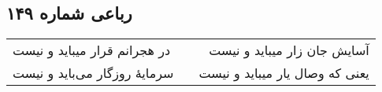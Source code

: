 \begin{center}
\section*{رباعی شماره ۱۴۹}
\label{sec:sh149}
\begin{longtable}{l p{0.5cm} r}
در هجرانم قرار میباید و نیست
&&
آسایش جان زار میباید و نیست
\\
سرمایهٔ روزگار می‌باید و نیست
&&
یعنی که وصال یار میباید و نیست
\\
\end{longtable}
\end{center}
